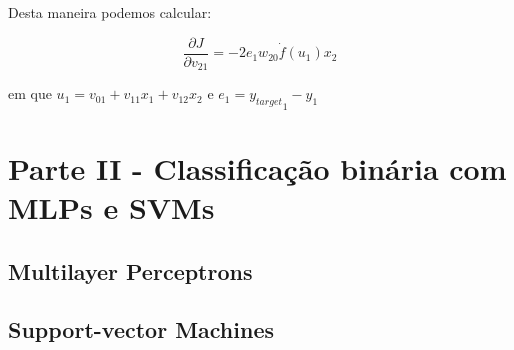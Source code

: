 \documentclass[a4paper, 12pt]{article}
\begin{document}
Desta maneira podemos calcular:

\[
    \frac{\partial J}{\partial v_{21}} = -2e_1w_{20}\dot{f}(u_1 ) x_2
\]

\vspace{1em}
em que $u_1 = v_{01} + v_{11}x_1 + v_{12}x_2$ e $e_1 = {y_{target}}_1 - y_1$

\section*{Parte II - Classificação binária com MLPs e SVMs}

\subsection*{Multilayer Perceptrons}

\subsection*{Support-vector Machines}
\end{document}

